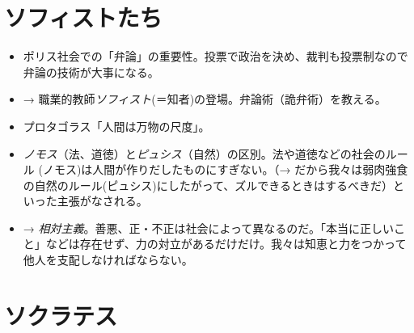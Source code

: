 \documentclass[uplatex,dvipdfmx]{jsarticle} \usepackage{mystyle}%
\begin{document}
\section{ソフィストたち}

\begin{itemize}
\item ポリス社会での「弁論」の重要性。投票で政治を決め、裁判も投票制なので弁論の技術が大事になる。
\item → 職業的教師\emph{ソフィスト}(＝知者)の登場。弁論術（詭弁術）を教える。
\item プロタゴラス「人間は万物の尺度」。
\item \emph{ノモス}（法、道徳）と\emph{ピュシス}（自然）の区別。法や道徳などの社会のルール
(ノモス)は人間が作りだしたものにすぎない。（→ だから我々は弱肉強食の自然のルール(ピュシス)にしたがって、ズルできるときはするべきだ）といった主張がなされる。

\item → \emph{相対主義}。善悪、正・不正は社会によって異なるのだ。「本当に正しいこと」などは存在せず、力の対立があるだけだけ。我々は知恵と力をつかって他人を支配しなければならない。


\end{itemize}




\section{ソクラテス}
\end{document}
